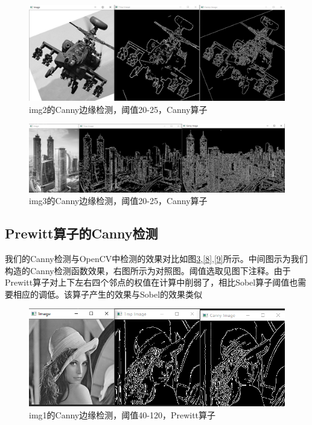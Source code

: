 \documentclass{article}
\begin{document}
\begin{figure}[htbp]
\centering
\includegraphics[width=13.5cm]{img/2-2.png}
\caption{img2的Canny边缘检测，阈值20-25，Canny算子}
\label{5}
\end{figure}

\begin{figure}[htbp]
\centering
\includegraphics[width=13.5cm]{img/2-3.png}
\caption{img3的Canny边缘检测，阈值20-25，Canny算子}
\label{6}
\end{figure}


\subsection{Prewitt算子的Canny检测}
我们的Canny检测与OpenCV中检测的效果对比如图\ref{7},\ref{8},\ref{9}所示。中间图示为我们构造的Canny检测函数效果，右图所示为对照图。阈值选取见图下注释。由于Prewitt算子对上下左右四个邻点的权值在计算中削弱了，相比Sobel算子阈值也需要相应的调低。该算子产生的效果与Sobel的效果类似

\begin{figure}[htbp]
\centering
\includegraphics[width=13.5cm]{img/3-1.png}
\caption{img1的Canny边缘检测，阈值40-120，Prewitt算子}
\label{7}
\end{figure}
\end{document}
